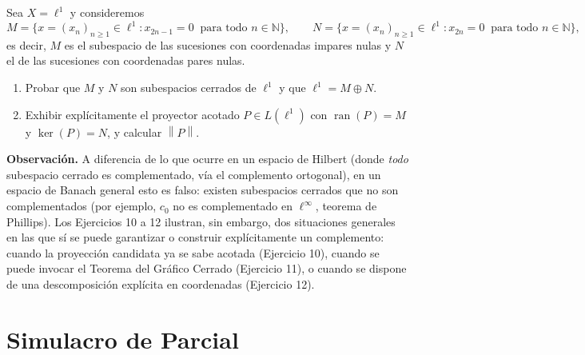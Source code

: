 \documentclass{article}
\theoremstyle{definition}
\newcommand{\N}{\mathbb{N}}
\newcommand{\norm}[1]{\left\lVert #1 \right\rVert}       %
\newcommand{\ran}{\operatorname{ran}}
\newenvironment{ejercicio}[1]{\begin{trivlist}
\item[\hskip \labelsep {\bfseries Ejercicio}\hskip \labelsep {\bfseries #1.}]}{\end{trivlist}}
\begin{document}
\vspace{0.3cm}

\begin{ejercicio}{12}
    Sea \( X = \ell^1 \) y consideremos
    \[
        M = \{ x = (x_n)_{n \ge 1} \in \ell^1 : x_{2n-1} = 0 \ \text{ para todo } n \in \N \}, \qquad
        N = \{ x = (x_n)_{n \ge 1} \in \ell^1 : x_{2n} = 0 \ \text{ para todo } n \in \N \},
    \]
    es decir, \( M \) es el subespacio de las sucesiones con coordenadas impares nulas y \( N \) el de las sucesiones con coordenadas pares nulas.
    \begin{enumerate}
        \item Probar que \( M \) y \( N \) son subespacios cerrados de \( \ell^1 \) y que \( \ell^1 = M \oplus N \).
        \item Exhibir explícitamente el proyector acotado \( P \in L(\ell^1) \) con \( \ran(P) = M \) y \( \ker(P) = N \), y calcular \( \norm{P} \).
    \end{enumerate}
\end{ejercicio}

\vspace{0.3cm}

\noindent
\textbf{Observación.} A diferencia de lo que ocurre en un espacio de Hilbert (donde \emph{todo} subespacio cerrado es complementado, vía el complemento ortogonal), en un espacio de Banach general esto es falso: existen subespacios cerrados que no son complementados (por ejemplo, \( c_0 \) no es complementado en \( \ell^\infty \), teorema de Phillips). Los Ejercicios 10 a 12 ilustran, sin embargo, dos situaciones generales en las que sí se puede garantizar o construir explícitamente un complemento: cuando la proyección candidata ya se sabe acotada (Ejercicio 10), cuando se puede invocar el Teorema del Gráfico Cerrado (Ejercicio 11), o cuando se dispone de una descomposición explícita en coordenadas (Ejercicio 12).

\clearpage

\section{Simulacro de Parcial}
\end{document}

